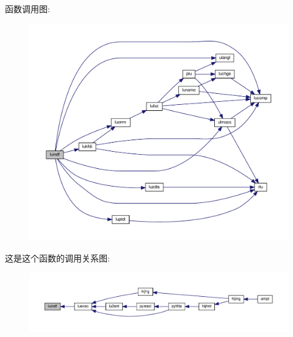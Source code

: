 函数调用图\+:
\nopagebreak
\begin{figure}[H]
\begin{center}
\leavevmode
\includegraphics[width=350pt]{luindf_8f90_a28d65e7ed933fdebd163a15f0118a285_cgraph}
\end{center}
\end{figure}
这是这个函数的调用关系图\+:
\nopagebreak
\begin{figure}[H]
\begin{center}
\leavevmode
\includegraphics[width=350pt]{luindf_8f90_a28d65e7ed933fdebd163a15f0118a285_icgraph}
\end{center}
\end{figure}
